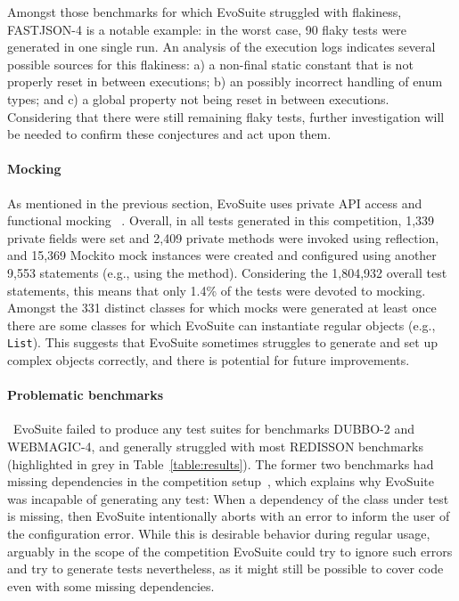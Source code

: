 \documentclass[sigconf,table]{acmart}
\newcommand{\EVOSUITE}{{\sc EvoSuite}\xspace}
\begin{document}
Amongst those benchmarks for which
\EVOSUITE struggled with flakiness, FASTJSON-4 is a notable example:
in the worst case, 90 flaky tests were generated in one single run. An
analysis of the execution logs indicates several possible sources for
this flakiness: a) a non-final static constant that is not properly
reset in between executions; b) an possibly incorrect handling of enum
types; and c) a global property not being reset in between
executions. Considering that there were still remaining flaky tests, further investigation will be needed to confirm these
conjectures and act upon them.


\paragraph{Mocking}

As mentioned in the previous section, \EVOSUITE uses private API
access and functional mocking%
~\cite{ICST_Mocking17}. Overall, in all tests generated in this
competition, 1,339 private fields were set and 2,409
private methods were invoked using reflection, and 15,369 Mockito mock
instances were created and configured using another 9,553 statements
(e.g., using the  method). Considering the 1,804,932 overall test
statements, this means that only 1.4\% of the tests were devoted to
mocking. Amongst the 331 distinct classes for which mocks were
generated at least once there are some classes for which EvoSuite can
instantiate regular objects (e.g., \texttt{List}). This suggests that
EvoSuite sometimes struggles to generate and set up complex objects
correctly, and there is potential for future improvements.




\paragraph{Problematic benchmarks}

~\EVOSUITE failed to produce any test suites for benchmarks DUBBO-2 and
WEBMAGIC-4, and generally struggled with most REDISSON benchmarks
(highlighted in grey in Table~\ref{table:results}). The former two
benchmarks had missing dependencies in the competition
setup~\cite{sbst18competition}, which explains why \EVOSUITE was
incapable of generating any test: When a dependency of the class under
test is missing, then \EVOSUITE intentionally aborts with an error to
inform the user of the configuration error. While this is desirable
behavior during regular usage, arguably in the scope of the
competition \EVOSUITE could try to ignore such errors and try to
generate tests nevertheless, as it might still be possible to cover
code even with some missing dependencies. 
\end{document}
